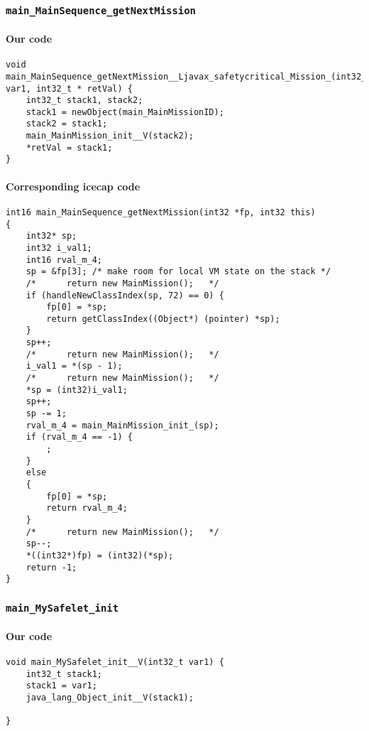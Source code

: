 \subsubsection{\texttt{main\_MainSequence\_getNextMission}}

\paragraph{Our code}\hfill
\begin{lstlisting}[firstnumber=1847]
void main_MainSequence_getNextMission__Ljavax_safetycritical_Mission_(int32_t var1, int32_t * retVal) {
	int32_t stack1, stack2;
	stack1 = newObject(main_MainMissionID);
	stack2 = stack1;
	main_MainMission_init__V(stack2);
	*retVal = stack1;
}
\end{lstlisting}

\paragraph{Corresponding icecap code}\hfill
\begin{lstlisting}[firstnumber=56253]
int16 main_MainSequence_getNextMission(int32 *fp, int32 this)
{
	int32* sp;
	int32 i_val1;
	int16 rval_m_4;
	sp = &fp[3]; /* make room for local VM state on the stack */
	/*		return new MainMission();   */
	if (handleNewClassIndex(sp, 72) == 0) {
		fp[0] = *sp;
		return getClassIndex((Object*) (pointer) *sp);
	}
	sp++;
	/*		return new MainMission();   */
	i_val1 = *(sp - 1);
	/*		return new MainMission();   */
	*sp = (int32)i_val1;
	sp++;
	sp -= 1;
	rval_m_4 = main_MainMission_init_(sp);
	if (rval_m_4 == -1) {
		;
	}
	else
	{
		fp[0] = *sp;
		return rval_m_4;
	}
	/*		return new MainMission();   */
	sp--;
	*((int32*)fp) = (int32)(*sp);
	return -1;
}
\end{lstlisting}


\subsubsection{\texttt{main\_MySafelet\_init}}

\paragraph{Our code}\hfill
\begin{lstlisting}[firstnumber=1948]
void main_MySafelet_init__V(int32_t var1) {
	int32_t stack1;
	stack1 = var1;
	java_lang_Object_init__V(stack1);

}
\end{lstlisting}


